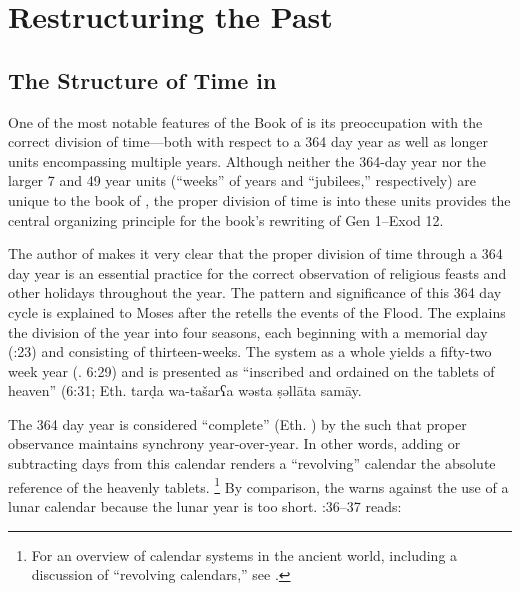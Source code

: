 
\section{Restructuring the Past}

\subsection{The Structure of Time in \jub}
One of the most notable features of the Book of \jub is its preoccupation with the correct division of time---both with respect to a 364 day year as well as longer units encompassing multiple years. Although neither the 364-day year nor the larger 7 and 49 year units (``weeks'' of years and ``jubilees,'' respectively) are unique to the book of \jub, the proper division of time is into these units provides the central organizing principle for the book's rewriting of Gen 1--Exod 12.

The author of \jub makes it very clear that the proper division of time through a 364 day year is an essential practice for the correct observation of religious feasts and other holidays throughout the year. The pattern and significance of this 364 day cycle is explained to Moses after the \ap retells the events of the Flood. The \ap explains the division of the year into four seasons, each beginning with a memorial day (:23) and consisting of thirteen-weeks. The system as a whole yields a fifty-two week year (\jub. 6:29) and is presented as ``inscribed and ordained on the tablets of heaven'' (6:31; Eth.
        {tarḍa wa-tašarʕa wəsta ṣəllāta samāy}.

The 364 day year is considered ``complete'' (Eth. ) by the \ap such that proper observance maintains synchrony year-over-year. In other words, adding or subtracting days from this calendar renders a ``revolving'' calendar \visavis the absolute reference of the heavenly tablets.%
    \footnote{For an overview of calendar systems in the ancient world, including a discussion of ``revolving calendars,'' see \cite[214]{glessmer_flint-vanderkam1999}.}
By comparison, the \ap warns against the use of a lunar calendar because the lunar year is too short. :36--37 reads:

